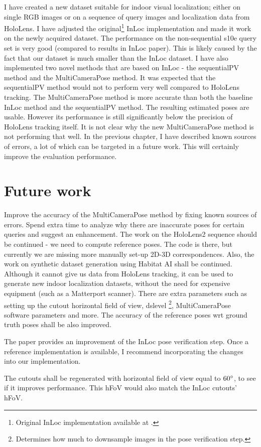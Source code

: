 \documentclass[twoside]{ctuthesis}
\theoremstyle{plain}
\theoremstyle{definition}
\theoremstyle{note}
\newcommand{\code}[1]{{\ttfamily #1%
}}
\begin{document}
I have created a new dataset suitable for indoor visual localization; either on single RGB images or on a sequence of query images and localization data from HoloLens. I have adjusted the original\footnote{Original InLoc implementation available at \cite{InLocImplementation}.} InLoc implementation and made it work on the newly acquired dataset. The performance on the non-sequential s10e query set is very good (compared to results in InLoc paper). This is likely caused by the fact that our dataset is much smaller than the InLoc dataset. I have also implemented two novel methods that are based on InLoc \cite{taira2018inloc} - the sequentialPV method and the MultiCameraPose method. It was expected that the sequentialPV method would not to perform very well compared to HoloLens tracking. The MultiCameraPose method is more accurate than both the baseline InLoc method and the sequentialPV method. The resulting estimated poses are usable. However its performance is still significantly below the precision of HoloLens tracking itself. It is not clear why the new MultiCameraPose method is not performing that well. In the previous chapter, I have described known sources of errors, a lot of which can be targeted in a future work. This will certainly improve the evaluation performance.

\section{Future work}
Improve the accuracy of the MultiCameraPose method by fixing known sources of errors. Spend extra time to analyze why there are inaccurate poses for certain queries and suggest an enhancement. The work on the HoloLens2 sequence should be continued - we need to compute reference poses. The code is there, but currently we are missing more manually set-up 2D-3D correspondences. Also, the work on synthetic dataset generation using Habitat AI shall be continued. Although it cannot give us data from HoloLens tracking, it can be used to generate new indoor localization datasets, without the need for expensive equipment (such as a Matterport scanner). There are extra parameters such as setting up the cutout horizontal field of view, \code{dslevel}\footnote{Determines how much to downsample images in the pose verification step.}, \code{MultiCameraPose} software \cite{MultiCameraPose} parameters and more. The accuracy of the reference poses wrt ground truth poses shall be also improved.

The paper \cite{IsThisTheRightPlace} provides an improvement of the InLoc pose verification step. Once a reference implementation is available, I recommend incorporating the changes into our implementation.

The cutouts shall be regenerated with horizontal field of view equal to $60\degree$, to see if it improves performance. This hFoV would also match the InLoc cutouts' hFoV.

\appendix

\printindex

\appendix

%


\end{document}
